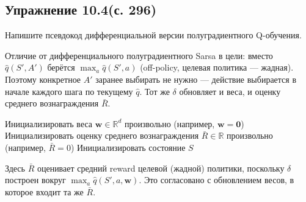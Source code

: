 \subsection{Упражнение 10.4(с. 296)}
Напишите псевдокод дифференциальной версии полуградиентного Q-обучения.

\begin{solution}
    Отличие от дифференциального полуградиентного Sarsa в цели: вместо
    $\hat q(S',A')$ берётся $\max_a \hat q(S',a)$ (off-policy, целевая политика ---
    жадная). Поэтому конкретное $A'$ заранее выбирать не нужно --- действие
    выбирается в начале каждого шага по текущему $\hat q$. Тот же $\delta$
    обновляет и веса, и оценку среднего вознаграждения $\bar R$.

    \begin{algorithm}[H]
        \DontPrintSemicolon
        Инициализировать веса $\mathbf w\in\mathbb R^d$ произвольно (например, $\mathbf w=\mathbf 0$)\;
        Инициализировать оценку среднего вознаграждения $\bar R\in\mathbb R$ произвольно (например, $\bar R=0$)\;
        Инициализировать состояние $S$\;
    \end{algorithm}

    Здесь $\bar R$ оценивает средний reward целевой (жадной) политики, поскольку
    $\delta$ построен вокруг $\max_a \hat q(S',a,\mathbf w)$. Это согласовано с
    обновлением весов, в которое входит та же $\bar R$.
\end{solution}

